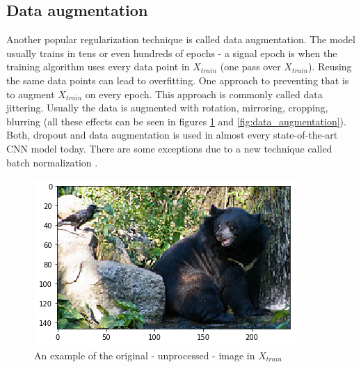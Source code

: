 \documentclass[times, utf8, diplomski]{fer}
\begin{document}
\subsection{Data augmentation}  \label{se:data_augmentation}

Another popular regularization technique is called data augmentation. The model usually trains in tens or even hundreds of epochs - a signal epoch is when the training algorithm uses every data point in $X_{train}$ (one pass over $X_{train}$). Reusing the same data points can lead to overfitting. One approach to preventing that is to augment $X_{train}$ on every epoch. This approach is commonly called data jittering. Usually the data is augmented with rotation, mirroring, cropping, blurring (all these effects can be seen in figures \ref{fig:data_augmentation_figure} and \ref{fig:data_augmentation}). Both, dropout and data augmentation is used in almost every state-of-the-art CNN model today. There are some exceptions due to a new technique called batch normalization \citep{ioffe_batch_2015}.

\begin{figure}
  \includegraphics[scale=0.7]{figures/data_augmentation.png}
  \centering
  \caption{An example of the original - unprocessed - image in $X_{train}$}
  \label{fig:data_augmentation_figure}
\end{figure}
\end{document}

